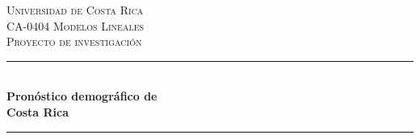 %
%
%
% 


	\newcommand{\HRule}{\rule{\linewidth}{0.5mm}} %
	
	\center %
	
	
	\textsc{\LARGE Universidad de Costa Rica}\\[1.5cm] %
	
	\textsc{\Large CA-0404 Modelos Lineales}\\[0.5cm] %
	
\textsc{\large Proyecto de investigación}\\[0.5cm] %

	
	\HRule\\[0.4cm]
	
	{\huge\bfseries Pronóstico demográfico de\\ Costa Rica}\\[0.4cm] %
	
	\HRule\\[1.5cm]
	
% 
	

